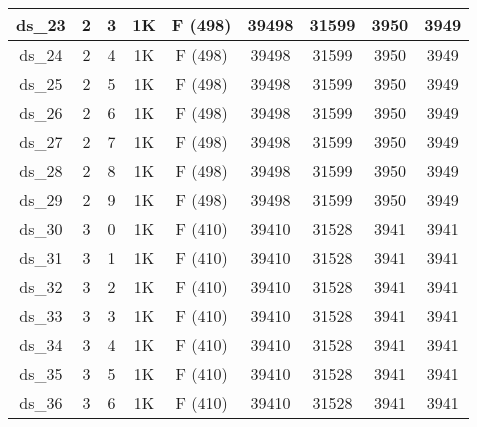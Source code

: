 \begin{footnotesize}
\begin{longtable}{|c|c|c|c|c|c|c|c|c|}
ds\_23      & 2           & 3           & 1K        & F (498)                     & 39498         & 31599          & 3950           & 3949          \\ \hline
ds\_24      & 2           & 4           & 1K        & F (498)                     & 39498         & 31599          & 3950           & 3949          \\ \hline
ds\_25      & 2           & 5           & 1K        & F (498)                     & 39498         & 31599          & 3950           & 3949          \\ \hline
ds\_26      & 2           & 6           & 1K        & F (498)                     & 39498         & 31599          & 3950           & 3949          \\ \hline
ds\_27      & 2           & 7           & 1K        & F (498)                     & 39498         & 31599          & 3950           & 3949          \\ \hline
ds\_28      & 2           & 8           & 1K        & F (498)                     & 39498         & 31599          & 3950           & 3949          \\ \hline
ds\_29      & 2           & 9           & 1K        & F (498)                     & 39498         & 31599          & 3950           & 3949          \\ \hline
ds\_30      & 3           & 0           & 1K        & F (410)                     & 39410         & 31528          & 3941           & 3941          \\ \hline
ds\_31      & 3           & 1           & 1K        & F (410)                     & 39410         & 31528          & 3941           & 3941          \\ \hline
ds\_32      & 3           & 2           & 1K        & F (410)                     & 39410         & 31528          & 3941           & 3941          \\ \hline
ds\_33      & 3           & 3           & 1K        & F (410)                     & 39410         & 31528          & 3941           & 3941          \\ \hline
ds\_34      & 3           & 4           & 1K        & F (410)                     & 39410         & 31528          & 3941           & 3941          \\ \hline
ds\_35      & 3           & 5           & 1K        & F (410)                     & 39410         & 31528          & 3941           & 3941          \\ \hline
ds\_36      & 3           & 6           & 1K        & F (410)                     & 39410         & 31528          & 3941           & 3941          \\ \hline

\end{longtable}
\end{footnotesize}
